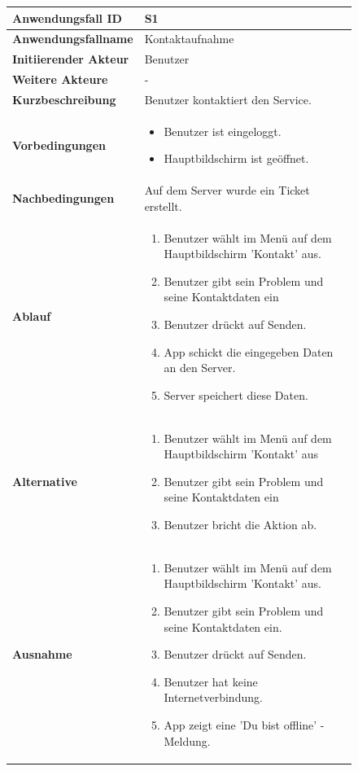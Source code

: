 \begin{figure}[H]
	\centering
	\begin{tabularx}{\textwidth}{ X | X }
		\textbf{Anwendungsfall ID} & S1 \\ \hline
		\textbf{Anwendungsfallname} & Kontaktaufnahme \\ \hline
		\textbf{Initiierender Akteur} & Benutzer \\ \hline
		\textbf{Weitere Akteure} & - \\ \hline
		\textbf{Kurzbeschreibung} & Benutzer kontaktiert den Service. \\ \hline
		\textbf{Vorbedingungen} &
		\begin {itemize}
			\item Benutzer ist eingeloggt.
			\item Hauptbildschirm ist geöffnet.
		\end{itemize}\\ \hline
		\textbf{Nachbedingungen} & Auf dem Server wurde ein Ticket erstellt. \\ \hline
		\textbf{Ablauf} &
		\begin{enumerate}
			\item Benutzer wählt im Menü auf dem Hauptbildschirm 'Kontakt' aus.
			\item Benutzer gibt sein Problem und seine Kontaktdaten ein
			\item Benutzer drückt auf Senden.
			\item App schickt die eingegeben Daten an den Server. 
			\item Server speichert diese Daten.
		\end{enumerate} \\ \hline
		\textbf{Alternative} &
		\begin{enumerate}
			\item Benutzer wählt im Menü auf dem Hauptbildschirm 'Kontakt' aus
			\item Benutzer gibt sein Problem und seine Kontaktdaten ein
			\item Benutzer bricht die Aktion ab.
		\end{enumerate}  \\ \hline
		\textbf{Ausnahme} &
		\begin{enumerate}
			\item Benutzer wählt im Menü auf dem Hauptbildschirm 'Kontakt' aus.
			\item Benutzer gibt sein Problem und seine Kontaktdaten ein.
			\item Benutzer drückt auf Senden.
			\item Benutzer hat keine Internetverbindung.
			\item App zeigt eine 'Du bist offline' -Meldung.
		\end{enumerate} 
	\end{tabularx}
\end{figure}

